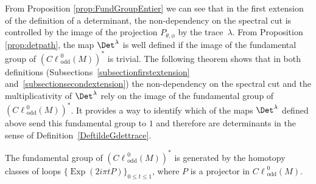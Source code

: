 \documentclass[pdftex]{sigma}
\DeclareMathOperator{\odd}{odd} \DeclareMathOperator{\supp}{supp}
\DeclareMathOperator{\Exp}{Exp} \DeclareMathOperator{\rk}{rk}
\def \Cl {{C\ell}}
\begin{document}
From Proposition \ref{prop:FundGroupEntier} we can see that in the f\/irst extension of the def\/inition of a determinant, the non-dependency on the spectral cut is controlled by the image of the projection $P_{\theta, \phi}$ by the trace~$\lambda$. From Proposition \ref{prop:detpath}, the map $\Det^\lambda$ is well def\/ined if the image of the fundamental group of $\left(\Cl^{0}_{\odd}(M)\right)^*$ is trivial.
The following theorem shows that in both def\/initions (Subsections~\ref{subsectionfirstextension} and~\ref{subsectionsecondextension}) the non-dependency on the spectral cut and the multiplicativity of $\Det^\lambda$ rely on the image of the fundamental group of $\left(\Cl^{0}_{\odd}(M)\right)^*$. It provides a way to identify which of the maps $\Det^\lambda$ def\/ined above send this fundamental group to $1$ and therefore are determinants in the sense of Def\/inition~\ref{DeftildeGdettrace}.

{\sloppy
\begin{theorem}
The fundamental group of $\left(\Cl^{0}_{\odd}(M)\right)^*$ is generated by the homotopy classes of loops $\{{\Exp}(2i\pi tP)\}_{0\leq t\leq1}$, where $P$ is a projector in $\Cl^{0}_{\odd}(M)$.
\end{theorem}

}
\end{document}
